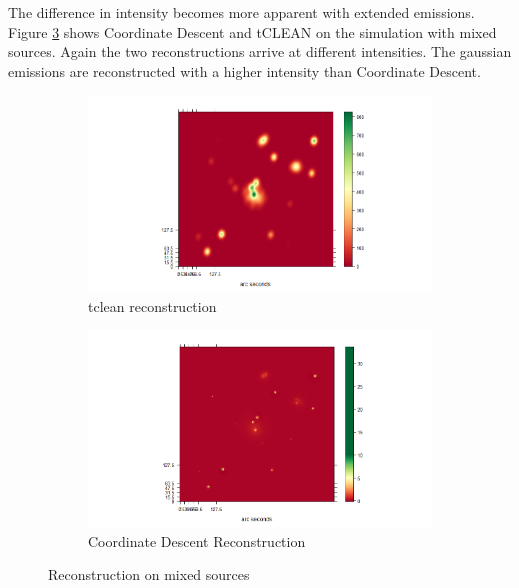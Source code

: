 The difference in intensity becomes more apparent with extended emissions. Figure \ref{results:mixed} shows Coordinate Descent and tCLEAN on the simulation with mixed sources. Again the two reconstructions arrive at different intensities. The gaussian emissions are reconstructed with a higher intensity than Coordinate Descent.

\begin{figure}[h]
	\centering
	\begin{subfigure}[b]{0.4\linewidth}
		\includegraphics[width=\linewidth]{./chapters/20.results/mixed/mixed_tclean.png}
		\caption{tclean reconstruction}
		\label{results:mixed:tclean}
	\end{subfigure}
	\begin{subfigure}[b]{0.4\linewidth}
		\includegraphics[width=\linewidth]{./chapters/20.results/mixed/mixed_cd.png}
		\caption{Coordinate Descent Reconstruction}
		\label{results:mixed:cd}
	\end{subfigure}
	\caption{Reconstruction on mixed sources}
	\label{results:mixed}
\end{figure}

